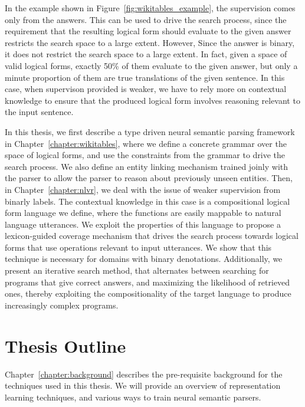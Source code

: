 In the example shown in Figure~\ref{fig:wikitables_example}, the supervision comes only from the answers. This can be used to drive the search process, since the requirement that the resulting
logical form should evaluate to the given answer restricts the search space to a large extent.
However,  Since the answer is binary, it does not restrict the search space to a large extent. In fact, given a space of valid logical forms, exactly 50\% of them evaluate
to the given answer, but only a minute proportion of them are true translations of the given sentence.
In this case, when supervison provided is weaker, we have to rely more on contextual knowledge
to ensure that the produced logical form involves reasoning relevant to the input sentence.

In this thesis, we first describe a type driven neural semantic parsing framework in Chapter~\ref{chapter:wikitables}, where we define a concrete grammar over the space
of logical forms, and use the constraints from the grammar to drive the search process. We also
define an entity linking mechanism trained joinly with the parser to allow the parser to reason about
previously unseen entities. Then, in Chapter~\ref{chapter:nlvr}, we deal with the issue of weaker supervision from binarly labels. The contextual knowledge
in this case is a compositional logical form language we define, where the functions are easily mappable to natural language utterances. We exploit the properties of this language to
propose a lexicon-guided coverage mechanism that drives the search process towards logical forms that use operations relevant to input utterances.
We show that this technique is necessary for domains with binary denotations. Additionally, we present an iterative search method, that alternates between searching
for programs that give correct answers, and maximizing the likelihood of retrieved ones, thereby exploiting the compositionality of the target language to produce increasingly complex programs. 

\section{Thesis Outline}

Chapter~\ref{chapter:background} describes the pre-requisite background for the techniques used in this thesis. We will provide an overview of representation learning techniques, and various ways to train neural semantic parsers.

